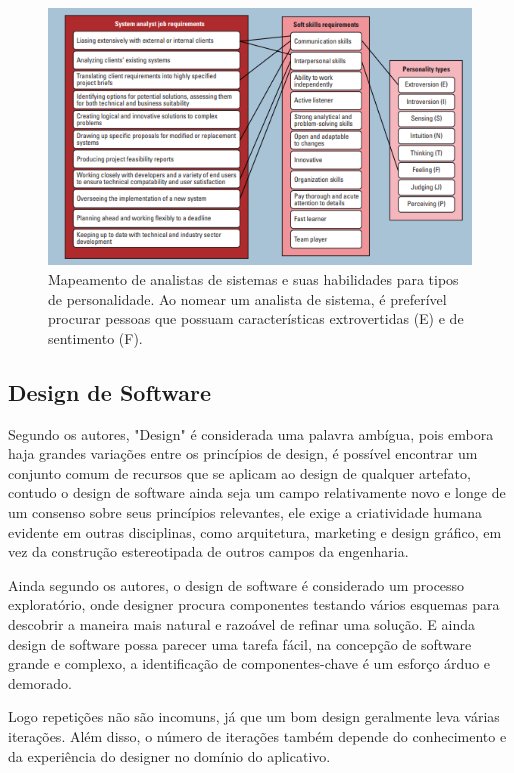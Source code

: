 \documentclass[12pt]{article}
\begin{document}
\begin{figure}[!ht]
\centering
\includegraphics[width=.7\textwidth]{Capturar1.PNG}
\caption{Mapeamento de analistas de sistemas e suas habilidades para tipos de personalidade. Ao nomear um analista de sistema, é preferível procurar pessoas que possuam características extrovertidas (E) e de sentimento (F).}
\label{fig:figura1}
\end{figure}

\subsection{Design de Software}
Segundo os autores, "Design" é considerada uma palavra ambígua, pois embora haja grandes variações entre os princípios de design, é possível encontrar um conjunto comum de recursos que se aplicam ao design de qualquer artefato, contudo o design de software ainda seja um campo relativamente novo e longe de um consenso sobre seus princípios relevantes, ele exige a criatividade humana evidente em outras disciplinas, como arquitetura, marketing e design gráfico, em vez da construção estereotipada de outros campos da engenharia. 

Ainda segundo os autores, o design de software é considerado um processo exploratório, onde designer procura componentes testando vários esquemas para descobrir a maneira mais natural e razoável de refinar uma solução. E ainda design de software possa parecer uma tarefa fácil, na concepção de software grande e complexo, a identificação de componentes-chave é um esforço árduo e demorado. 

Logo repetições não são incomuns, já que um bom design geralmente leva várias iterações. Além disso, o número de iterações também depende do conhecimento e da experiência do designer no domínio do aplicativo.
\end{document}
